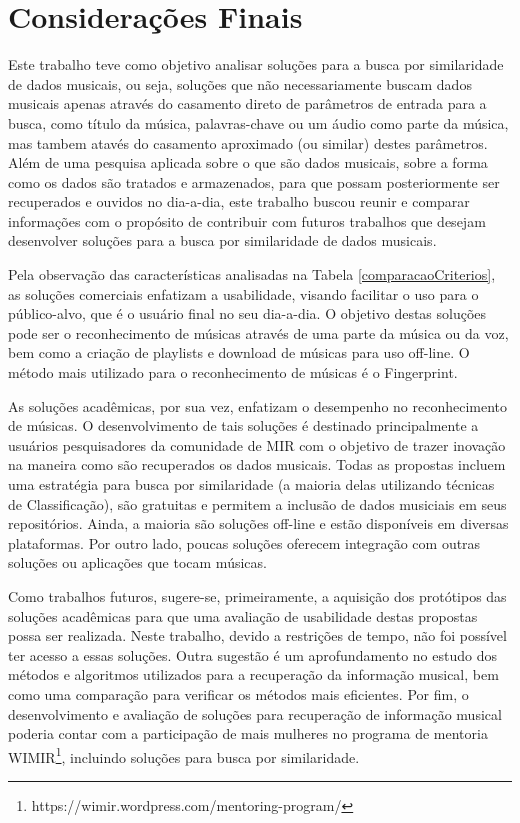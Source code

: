 \chapter{Considerações Finais} \label{cap:consideracoes-finais}

Este trabalho teve como objetivo analisar soluções para a busca por similaridade de dados musicais, ou seja, soluções que não necessariamente buscam dados musicais apenas através do casamento direto de parâmetros de entrada para a busca, como título da música, palavras-chave ou um áudio como parte da música, mas tambem atavés do casamento aproximado (ou similar) destes parâmetros. Além de uma pesquisa aplicada sobre o que são dados musicais, sobre a forma como os dados são tratados e armazenados, para que possam posteriormente ser recuperados e ouvidos no dia-a-dia, este trabalho buscou reunir e comparar informações com o propósito de contribuir com futuros trabalhos que desejam desenvolver soluções para a busca por similaridade de dados musicais.

Pela observação das características analisadas na Tabela \ref{comparacaoCriterios}, as soluções comerciais enfatizam a usabilidade, visando facilitar o uso para o público-alvo, que é o usuário final no seu dia-a-dia. O objetivo destas soluções pode ser o reconhecimento de músicas através de uma parte da música ou da voz, bem como a criação de playlists e download de músicas para uso off-line. O método mais utilizado para o reconhecimento de músicas é o Fingerprint.

As soluções acadêmicas, por sua vez, enfatizam o desempenho no reconhecimento de músicas. O desenvolvimento de tais soluções é destinado principalmente a usuários pesquisadores da comunidade de MIR com o objetivo de trazer inovação na maneira como são recuperados os dados musicais. Todas as propostas incluem uma estratégia para busca por similaridade (a maioria delas utilizando técnicas de Classificação), são gratuitas e permitem a inclusão de dados musiciais em seus repositórios. Ainda, a maioria são soluções off-line e estão disponíveis em diversas plataformas. Por outro lado, poucas soluções oferecem integração com outras soluções ou aplicações que tocam músicas. 

Como trabalhos futuros, sugere-se, primeiramente, a aquisição dos protótipos das soluções acadêmicas para que uma avaliação de usabilidade destas propostas possa ser realizada. Neste trabalho, devido a restrições de tempo, não foi possível ter acesso a essas soluções. Outra sugestão é um aprofundamento no estudo dos métodos e algoritmos utilizados para a recuperação da informação musical, bem como uma comparação para verificar os métodos mais eficientes. Por fim, o desenvolvimento e avaliação de soluções para recuperação de informação musical poderia contar com a participação de mais mulheres no programa de mentoria WIMIR\footnote{https://wimir.wordpress.com/mentoring-program/}, incluindo soluções para busca por similaridade.
